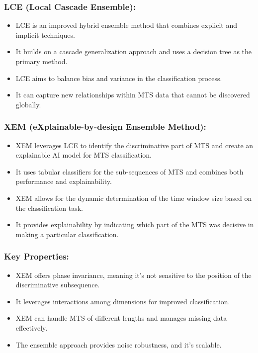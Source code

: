 \documentclass{article}
\begin{document}
\subsubsection{LCE (Local Cascade Ensemble):}

\begin{itemize}
    \item LCE is an improved hybrid ensemble method that combines explicit and implicit techniques.
    \item It builds on a cascade generalization approach and uses a decision tree as the primary method.
    \item LCE aims to balance bias and variance in the classification process.
    \item It can capture new relationships within MTS data that cannot be discovered globally.
\end{itemize}

\subsubsection{XEM (eXplainable-by-design Ensemble Method):}

\begin{itemize}
    \item XEM leverages LCE to identify the discriminative part of MTS and create an explainable AI model for MTS classification.
    \item It uses tabular classifiers for the sub-sequences of MTS and combines both performance and explainability.
    \item XEM allows for the dynamic determination of the time window size based on the classification task.
    \item It provides explainability by indicating which part of the MTS was decisive in making a particular classification.
\end{itemize}

\subsubsection{Key Properties:}

\begin{itemize}
    \item XEM offers phase invariance, meaning it's not sensitive to the position of the discriminative subsequence.
    \item It leverages interactions among dimensions for improved classification.
    \item XEM can handle MTS of different lengths and manages missing data effectively.
    \item The ensemble approach provides noise robustness, and it's scalable.
\end{itemize}
\end{document}
